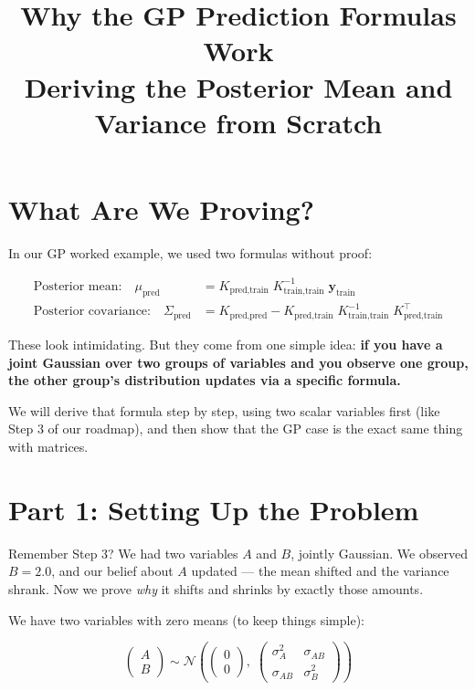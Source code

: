 \documentclass[11pt, a4paper]{article}
\title{\color{secblue}\textbf{Why the GP Prediction Formulas Work}\\[0.3em]
\Large Deriving the Posterior Mean and Variance from Scratch}
\author{}
\date{}
\newcommand{\recap}[1]{\begin{tcolorbox}[colback=lightblue, colframe=secblue!50, title=Recap]#1\end{tcolorbox}}
\begin{document}
\maketitle
\thispagestyle{fancy}

\section*{\color{secblue}What Are We Proving?}

In our GP worked example, we used two formulas without proof:

\begin{align}
\text{Posterior mean:} \quad \mu_{\text{pred}} &= K_{\text{pred,train}} \; K_{\text{train,train}}^{-1} \; \mathbf{y}_{\text{train}} \tag{Goal-1} \\[6pt]
\text{Posterior covariance:} \quad \Sigma_{\text{pred}} &= K_{\text{pred,pred}} - K_{\text{pred,train}} \; K_{\text{train,train}}^{-1} \; K_{\text{pred,train}}^\top \tag{Goal-2}
\end{align}

These look intimidating. But they come from one simple idea: \textbf{if you have a joint Gaussian over two groups of variables and you observe one group, the other group's distribution updates via a specific formula.}

We will derive that formula step by step, using two scalar variables first (like Step 3 of our roadmap), and then show that the GP case is the exact same thing with matrices.


\section*{\color{secblue}Part 1: Setting Up the Problem}

\recap{
Remember Step 3? We had two variables $A$ and $B$, jointly Gaussian. We observed $B = 2.0$, and our belief about $A$ updated --- the mean shifted and the variance shrank. Now we prove \emph{why} it shifts and shrinks by exactly those amounts.
}

\bigskip
We have two variables with zero means (to keep things simple):

\begin{equation}
\begin{pmatrix} A \\ B \end{pmatrix}
\sim
\mathcal{N}\!\left(
\begin{pmatrix} 0 \\ 0 \end{pmatrix},\;
\begin{pmatrix} \sigma_A^2 & \sigma_{AB} \\ \sigma_{AB} & \sigma_B^2 \end{pmatrix}
\right)
\tag{P1}
\end{equation}
\end{document}
